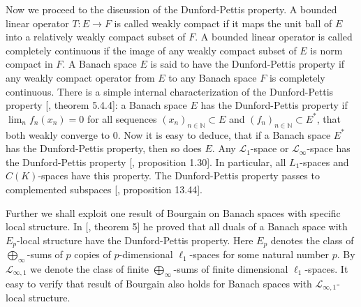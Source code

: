 \documentclass[12pt]{article}
\begin{document}
Now we proceed to the discussion of the Dunford-Pettis property. A bounded
linear operator $T:E\to F$ is called weakly compact if it maps the unit ball of
$E$ into a relatively weakly compact subset of $F$. A bounded linear operator is
called completely continuous if the image of any weakly compact subset of $E$ is
norm compact in $F$. A Banach space $E$ is said to have the Dunford-Pettis
property if any weakly compact operator from $E$ to any Banach space $F$ is
completely continuous. There is a simple internal characterization of the
Dunford-Pettis property [\cite{KalAlbTopicsBanSpTh}, theorem 5.4.4]: a Banach
space $E$ has the Dunford-Pettis property if $\lim_n f_n(x_n)=0$ for all
sequences ${(x_n)}_{n\in\mathbb{N}}\subset E$ and
${(f_n)}_{n\in\mathbb{N}}\subset E^*$, that both weakly converge to $0$. Now it
is easy to deduce, that if a Banach space $E^*$ has the Dunford-Pettis property,
then so does $E$.  Any $\mathscr{L}_1$-space or $\mathscr{L}_\infty$-space has
the Dunford-Pettis property [\cite{BourgNewClOfLpSp}, proposition 1.30]. In
particular, all $L_1$-spaces and $C(K)$-spaces have this property. The
Dunford-Pettis property passes to complemented subspaces [\cite{FabHabBanSpTh},
        proposition 13.44].

Further we shall exploit one result of Bourgain on Banach spaces with specific
local structure. In [\cite{BourgOnTheDPP}, theorem 5] he proved that all duals
of a Banach space with $E_p$-local structure have the Dunford-Pettis property.
Here $E_p$ denotes the class of  $\bigoplus_\infty$-sums of $p$ copies of
$p$-dimensional $\ell_1$-spaces for some natural number $p$. By
$\mathcal{L}_{\infty,1}$ we denote the class of finite $\bigoplus_\infty$-sums
of finite dimensional $\ell_1$-spaces. It easy to verify that result of Bourgain
also holds for Banach spaces with $\mathcal{L}_{\infty,1}$-local structure.
\end{document}
